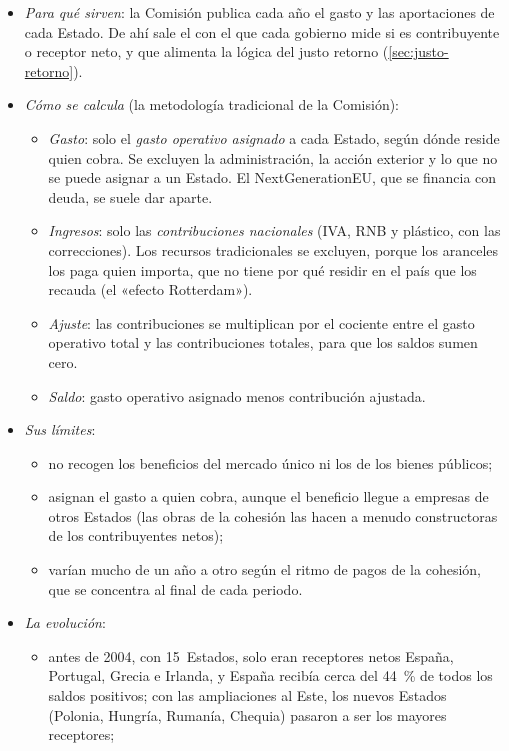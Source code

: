 \documentclass[11pt]{article}
\begin{document}
\begin{itemize}
\item \emph{Para qué sirven}: la Comisión publica cada año el gasto y las aportaciones de cada Estado. De ahí sale el  con el que cada gobierno mide si es contribuyente o receptor neto, y que alimenta la lógica del justo retorno (\ref{sec:justo-retorno}).
\item \emph{Cómo se calcula} (la metodología tradicional de la Comisión):
  \begin{itemize}
  \item \emph{Gasto}: solo el \emph{gasto operativo asignado} a cada Estado, según dónde reside quien cobra. Se excluyen la administración, la acción exterior y lo que no se puede asignar a un Estado. El NextGenerationEU, que se financia con deuda, se suele dar aparte.
  \item \emph{Ingresos}: solo las \emph{contribuciones nacionales} (IVA, RNB y plástico, con las correcciones). Los recursos tradicionales se excluyen, porque los aranceles los paga quien importa, que no tiene por qué residir en el país que los recauda (el «efecto Rotterdam»).
  \item \emph{Ajuste}: las contribuciones se multiplican por el cociente entre el gasto operativo total y las contribuciones totales, para que los saldos sumen cero.
  \item \emph{Saldo}: gasto operativo asignado menos contribución ajustada.
  \end{itemize}
\item \emph{Sus límites}:
  \begin{itemize}
  \item no recogen los beneficios del mercado único ni los de los bienes públicos;
  \item asignan el gasto a quien cobra, aunque el beneficio llegue a empresas de otros Estados (las obras de la cohesión las hacen a menudo constructoras de los contribuyentes netos);
  \item varían mucho de un año a otro según el ritmo de pagos de la cohesión, que se concentra al final de cada periodo.
  \end{itemize}
\item \emph{La evolución}:
  \begin{itemize}
  \item antes de 2004, con 15~Estados, solo eran receptores netos España, Portugal, Grecia e Irlanda, y España recibía cerca del 44~\% de todos los saldos positivos; con las ampliaciones al Este, los nuevos Estados (Polonia, Hungría, Rumanía, Chequia) pasaron a ser los mayores receptores\nocite{CamareroTamaritAnchuelo2019};

\end{itemize}
\end{itemize}
\end{document}
